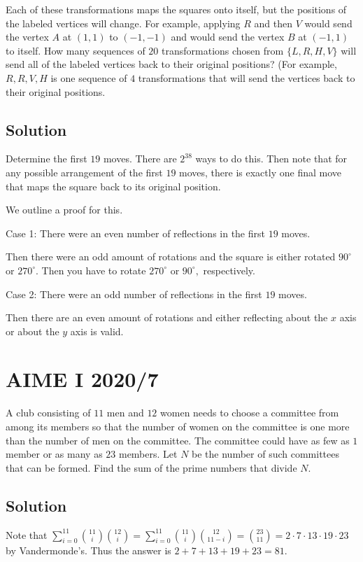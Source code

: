 \documentclass{article}
\begin{document}
Each of these transformations maps the squares onto itself, but the positions of the labeled vertices will change. For example, applying $R$ and then $V$ would send the vertex $A$ at $(1,1)$ to $(-1,-1)$ and would send the vertex $B$ at $(-1,1)$ to itself. How many sequences of $20$ transformations chosen from $\{L, R, H, V\}$ will send all of the labeled vertices back to their original positions? (For example, $R, R, V, H$ is one sequence of $4$ transformations that will send the vertices back to their original positions.

\subsection{Solution}
Determine the first $19$ moves. There are $2^{38}$ ways to do this. Then note that for any possible arrangement of the first $19$ moves, there is exactly one final move that maps the square back to its original position.
    
We outline a proof for this.
    
Case 1: There were an even number of reflections in the first $19$ moves.

Then there were an odd amount of rotations and the square is either rotated $90^{\circ}$ or $270^{\circ}.$ Then you have to rotate $270^{\circ}$ or $90^{\circ},$ respectively.

Case 2: There were an odd number of reflections in the first $19$ moves.

Then there are an even amount of rotations and either reflecting about the $x$ axis or about the $y$ axis is valid.

\pagebreak\section{AIME I 2020/7}
A club consisting of $11$ men and $12$ women needs to choose a committee from among its members so that the number of women on the committee is one more than the number of men on the committee. The committee could have as few as $1$ member or as many as $23$ members. Let $N$ be the number of such committees that can be formed. Find the sum of the prime numbers that divide $N.$

\subsection{Solution}
Note that $\sum_{i=0}^{11}\binom{11}{i}\binom{12}{i}=\sum_{i=0}^{11}\binom{11}{i}\binom{12}{11-i}=\binom{23}{11}=2\cdot 7\cdot 13\cdot 19\cdot 23$ by Vandermonde's. Thus the answer is $2+7+13+19+23=81.$
    
\end{document}
